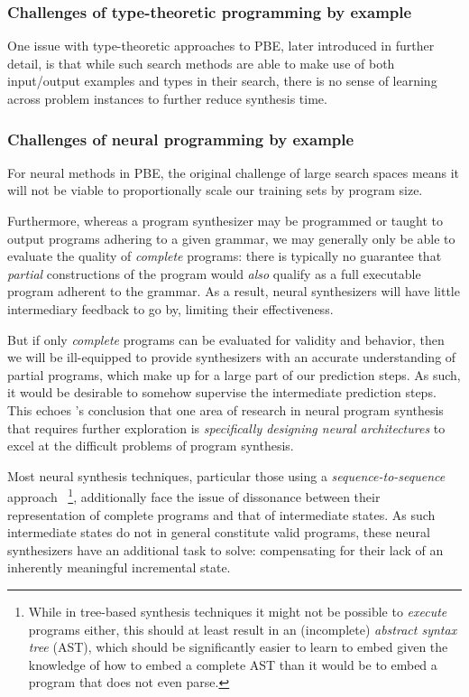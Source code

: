 \documentclass{article}
\begin{document}
\subsubsection{Challenges of type-theoretic programming by example} \label{sec:typepbe}

One issue with type-theoretic approaches to PBE, later introduced in further detail,
is that while such search methods are able to make use of both input/output examples and types in their search,
there is no sense of learning across problem instances to further reduce synthesis time.

\subsubsection{Challenges of neural programming by example} %

For neural methods in PBE, the original challenge of large search spaces means
it will not be viable to proportionally scale our training sets by program size.

Furthermore, whereas a program synthesizer may be programmed or taught to output programs adhering to a given grammar,
we may generally only be able to evaluate the quality of \emph{complete} programs:
there is typically no guarantee that \emph{partial} constructions of the program would \emph{also} qualify as a full executable program adherent to the grammar.
As a result, neural synthesizers will have little intermediary feedback to go by, limiting their effectiveness.

But if only \emph{complete} programs can be evaluated for validity and behavior, then 
we will be ill-equipped to provide synthesizers with an accurate understanding of partial programs,
which make up for a large part of our prediction steps.
As such, it would be desirable to somehow supervise the intermediate prediction steps.
This echoes \citet{nps}'s conclusion that one area of research in neural program synthesis that requires further exploration is
\emph{specifically designing neural architectures} to excel at the difficult problems of program synthesis.


Most neural synthesis techniques, particular those using a \emph{sequence-to-sequence} approach%
~\footnote{
    While in tree-based synthesis techniques it might not be possible to \emph{execute} programs either,
    this should at least result in an (incomplete) \emph{abstract syntax tree} (AST),
    which should be significantly easier to learn to embed given the knowledge of how to embed a complete AST than it would be to embed a program that does not even parse.
},
additionally face the issue of dissonance between their representation of complete programs and that of intermediate states.
As such intermediate states do not in general constitute valid programs,
these neural synthesizers have an additional task to solve:
compensating for their lack of an inherently meaningful incremental state.
\end{document}
